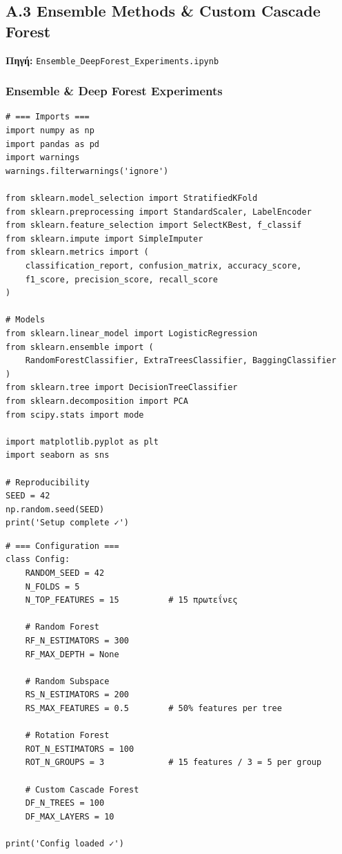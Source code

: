 \subsection{A.3 Ensemble Methods \& Custom Cascade Forest}
 
\noindent \textbf{Πηγή:} \texttt{Ensemble\_DeepForest\_Experiments.ipynb}
 
 
\subsubsection*{Ensemble \& Deep Forest Experiments}
 
\begin{lstlisting}
# === Imports ===
import numpy as np
import pandas as pd
import warnings
warnings.filterwarnings('ignore')
 
from sklearn.model_selection import StratifiedKFold
from sklearn.preprocessing import StandardScaler, LabelEncoder
from sklearn.feature_selection import SelectKBest, f_classif
from sklearn.impute import SimpleImputer
from sklearn.metrics import (
    classification_report, confusion_matrix, accuracy_score,
    f1_score, precision_score, recall_score
)
 
# Models
from sklearn.linear_model import LogisticRegression
from sklearn.ensemble import (
    RandomForestClassifier, ExtraTreesClassifier, BaggingClassifier
)
from sklearn.tree import DecisionTreeClassifier
from sklearn.decomposition import PCA
from scipy.stats import mode
 
import matplotlib.pyplot as plt
import seaborn as sns
 
# Reproducibility
SEED = 42
np.random.seed(SEED)
print('Setup complete ✓')
\end{lstlisting}
 
\begin{lstlisting}
# === Configuration ===
class Config:
    RANDOM_SEED = 42
    N_FOLDS = 5
    N_TOP_FEATURES = 15          # 15 πρωτεΐνες
 
    # Random Forest
    RF_N_ESTIMATORS = 300
    RF_MAX_DEPTH = None
 
    # Random Subspace
    RS_N_ESTIMATORS = 200
    RS_MAX_FEATURES = 0.5        # 50% features per tree
 
    # Rotation Forest
    ROT_N_ESTIMATORS = 100
    ROT_N_GROUPS = 3             # 15 features / 3 = 5 per group
 
    # Custom Cascade Forest
    DF_N_TREES = 100
    DF_MAX_LAYERS = 10
 
print('Config loaded ✓')
\end{lstlisting}
 
